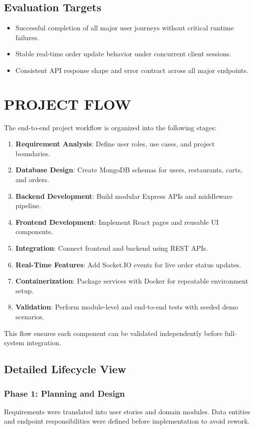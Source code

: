 \documentclass[12pt,a4paper]{report}
\begin{document}
\section{Evaluation Targets}
\begin{itemize}
    \item Successful completion of all major user journeys without critical runtime failures.
    \item Stable real-time order update behavior under concurrent client sessions.
    \item Consistent API response shape and error contract across all major endpoints.
\end{itemize}

\chapter{PROJECT FLOW}
The end-to-end project workflow is organized into the following stages:

\begin{enumerate}
    \item \textbf{Requirement Analysis}: Define user roles, use cases, and project boundaries.
    \item \textbf{Database Design}: Create MongoDB schemas for users, restaurants, carts, and orders.
    \item \textbf{Backend Development}: Build modular Express APIs and middleware pipeline.
    \item \textbf{Frontend Development}: Implement React pages and reusable UI components.
    \item \textbf{Integration}: Connect frontend and backend using REST APIs.
    \item \textbf{Real-Time Features}: Add Socket.IO events for live order status updates.
    \item \textbf{Containerization}: Package services with Docker for repeatable environment setup.
    \item \textbf{Validation}: Perform module-level and end-to-end tests with seeded demo scenarios.
\end{enumerate}

This flow ensures each component can be validated independently before full-system integration.

\section{Detailed Lifecycle View}
\subsection{Phase 1: Planning and Design}
Requirements were translated into user stories and domain modules. Data entities and endpoint responsibilities were defined before implementation to avoid rework.
\end{document}
